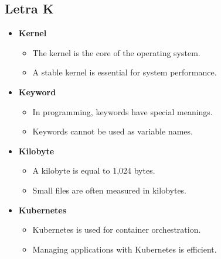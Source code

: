     \subsection{Letra K}
    \begin{itemize}
        \item \textbf{Kernel}
        \begin{itemize}
            \item The kernel is the core of the operating system.
            \item A stable kernel is essential for system performance.
        \end{itemize}
        \item \textbf{Keyword}
        \begin{itemize}
            \item In programming, keywords have special meanings.
            \item Keywords cannot be used as variable names.
        \end{itemize}
        \item \textbf{Kilobyte}
        \begin{itemize}
            \item A kilobyte is equal to 1,024 bytes.
            \item Small files are often measured in kilobytes.
        \end{itemize}
        \item \textbf{Kubernetes}
        \begin{itemize}
            \item Kubernetes is used for container orchestration.
            \item Managing applications with Kubernetes is efficient.
        \end{itemize}
    \end{itemize}

